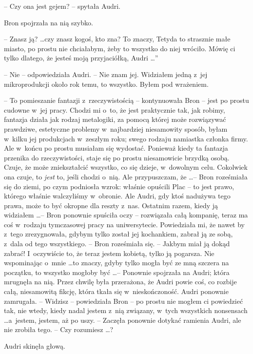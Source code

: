 \documentclass[oneside,polish,11pt,rmheadings]{mwbk}
\begin{document}
-- Czy ona jest gejem? -- spytała Audri. 

Bron spojrzała na nią szybko. 

-- Znasz ją? \ldots  czy znasz kogoś, kto zna? To znaczy, Tetyda to strasznie małe miasto, po prostu nie chciałabym, żeby to wszystko do niej wróciło. Mówię ci tylko dlatego, że jesteś moją przyjaciółką, Audri \ldots '' 

-- Nie -- odpowiedziała Audri. -- Nie znam jej. Widziałem jedną z~jej mikroprodukcji około rok temu, to wszystko. Byłem pod wrażeniem. 

-- To pomieszanie fantazji z~rzeczywistością -- kontynuowała Bron -- jest po prostu cudowne w~jej pracy. Chodzi mi o~to, że jest praktycznie tak, jak robimy, fantazja działa jak rodzaj metalogiki, za pomocą której może rozwiązywać prawdziwe, estetyczne problemy w~najbardziej niesamowity sposób, byłam w~kilku jej produkcjach w~zeszłym roku; swego rodzaju namiastka członka firmy. Ale w~końcu po prostu musiałam się wydostać. Ponieważ kiedy ta fantazja przenika do rzeczywistości, staje się po prostu niesamowicie brzydką osobą. Czuje, że może zniekształcić wszystko, co się dzieje, w~dowolnym celu. Cokolwiek ona czuje, to \textit{jest }to, jeśli chodzi o~nią. Ale przypuszczam, że \ldots  -- Bron roześmiała się do ziemi, po czym podniosła wzrok: właśnie opuścili Plac -- to jest prawo, którego właśnie walczyliśmy w~obronie. Ale Audri, gdy ktoś nadużywa tego prawa, może to być okropne dla reszty z~nas. Ostatnim razem, kiedy ją widziałem \ldots  --  Bron ponownie spuściła oczy -- rozwiązała całą kompanię, teraz ma coś w~rodzaju tymczasowej pracy na uniwersytecie. Powiedziała mi, że nawet by z~tego zrezygnowała, gdybym tylko został jej kochankiem, zabrał ją ze sobą, z~dala od tego wszystkiego. -- Bron roześmiała się. -- Jakbym miał ją dokąd zabrać! I~oczywiście to, że teraz jestem kobietą, tylko ją pogarsza. Nie wspominając o~mnie \ldots   to znaczy, gdyby tylko mogła być ze mną szczera na początku, to wszystko mogłoby być \ldots -- Ponownie spojrzała na Audri; która mrugnęła na nią. Przez chwilę była przerażona, że Audri powie coś, co rozbije całą, niesamowitą fikcję, która tkała się w~nieskończoność. Audri ponownie zamrugała. -- Widzisz -- powiedziała Bron -- po prostu nie mogłem ci powiedzieć tak, nie wtedy, kiedy nadal jestem z~nią związany, w~tych wszystkich nonsensach \ldots  a~jestem, jestem, aż po uszy. -- Zaczęła ponownie dotykać ramienia Audri, ale nie zrobiła tego. -- Czy rozumiesz  \ldots  ? 

Audri skinęła głową. 
\end{document}
